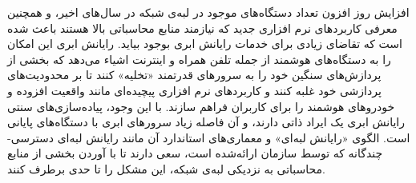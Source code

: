 افزایش روز افزون تعداد دستگاه‌های موجود در لبه‌ی شبکه در سال‌های اخیر، و همچنین معرفی کاربردهای نرم افزاری جدید که نیازمند منابع محاسباتی بالا هستند باعث شده است که تقاضای زیادی برای خدمات رایانش ابری بوجود بیاید. رایانش ابری این امکان را به دستگاه‌های هوشمند از جمله تلفن همراه و اینترنت اشیاء می‌دهد که بخشی از پردازش‌های سنگین خود را به سرورهای قدرتمند «تخلیه» کنند تا بر محدودیت‌های پردازشی خود غلبه کنند و کاربردهای نرم افزاری پیچیده‌ای مانند واقعیت افزوده و خودروهای هوشمند را برای کاربران فراهم سازند. با این وجود، پیاده‌سازی‌های سنتی رایانش ابری یک ایراد ذاتی دارند، و آن فاصله زیاد سرورهای ابری با دستگاه‌های پایانی است. الگوی «رایانش لبه‌ای» و معماری‌های استاندارد آن مانند رایانش لبه‌ای دسترسی-چندگانه که توسط سازمان  ارائه‌شده است، سعی دارند تا با آوردن بخشی از منابع محاسباتی به نزدیکی لبه‌ی شبکه، این مشکل را تا حدی برطرف کنند. \\ 

